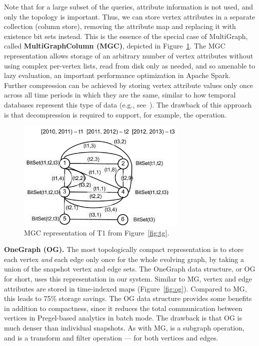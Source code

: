 Note that for a large subset of the queries, attribute information is
not used, and only the topology is important.  Thus, we can store
vertex attributes in a separate collection (column store), removing
the attribute map and replacing it with existence bit sets instead.
This is the essence of the special case of MultiGraph, called {\bf
  MultiGraphColumn (MGC)}, depicted in Figure~\ref{fig:mgc}.  The MGC
representation allows storage of an arbitrary number of vertex
attributes without using complex per-vertex lists, read from disk only
as needed, and so amenable to lazy evaluation, an important
performance optimization in Apache Spark.  Further compression can be
achieved by storing vertex attribute values only once across all time
periods in which they are the same, similar to how temporal databases
represent this type of data (e.g., see~\cite{Muller2008}).  The
drawback of this approach is that decompression is required to
support, for example, the  operation.

\begin{figure}[t!]
\includegraphics[width=3.2in]{figs/mgc.pdf}
\caption{MGC representation of T1 from Figure~\ref{fig:tg}.}
\label{fig:mgc}
\end{figure}

{\bf OneGraph (OG).}  The most topologically compact representation is
to store each vertex {\em and} each edge only once for the whole
evolving graph, by taking a union of the snapshot vertex and edge
sets.  The OneGraph data structure, or OG for short, uses this
representation in our system.  Similar to MG, vertex and edge
attributes are stored in time-indexed maps (Figure~\ref{fig:og}).
Compared to MG, this leads to 75\% storage savings.  The OG data
structure provides some benefits in addition to compactness, since it
reduces the total communication between vertices in Pregel-based
analytics in batch mode.  The drawback is that OG is much denser than
individual snapshots.  As with MG,  is a subgraph
operation, and  is a transform and filter operation ---
for both vertices and edges.

